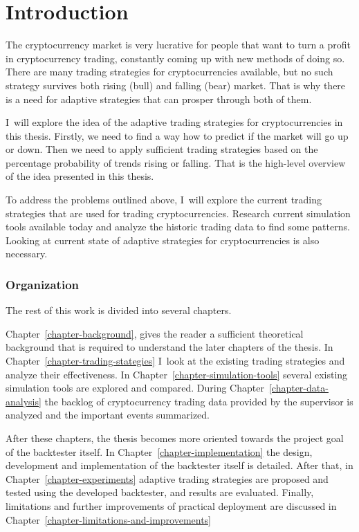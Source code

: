 
\chapter{Introduction}

The cryptocurrency market is very lucrative for people that want to turn a profit in cryptocurrency trading, constantly coming up with new methods of doing so. There are many trading strategies for cryptocurrencies available, but no such strategy survives both rising (bull) and falling (bear) market. That is why there is a need for adaptive strategies that can prosper through both of them.

I~will explore the idea of the adaptive trading strategies for cryptocurrencies in this thesis. Firstly, we need to find a way how to predict if the market will go up or down. Then we need to apply sufficient trading strategies based on the percentage probability of trends rising or falling. That is the high-level overview of the idea presented in this thesis.

To address the problems outlined above, I~will explore the current trading strategies that are used for trading cryptocurrencies. Research current simulation tools available today and analyze the historic trading data to find some patterns. Looking at current state of adaptive strategies for cryptocurrencies is also necessary.

\subsection*{Organization}

The rest of this work is divided into several chapters.

Chapter~\ref{chapter-background}, gives the reader a sufficient theoretical background that is required to understand the later chapters of the thesis. In Chapter~\ref{chapter-trading-stategies} I~look at the existing trading strategies and analyze their effectiveness. In Chapter~\ref{chapter-simulation-tools} several existing simulation tools are explored and compared. During Chapter~\ref{chapter-data-analysis} the backlog of cryptocurrency trading data provided by the supervisor is analyzed and the important events summarized.

After these chapters, the thesis becomes more oriented towards the project goal of the backtester itself. In Chapter~\ref{chapter-implementation} the design, development and implementation of the backtester itself is detailed. After that, in Chapter~\ref{chapter-experiments} adaptive trading strategies are proposed and tested using the developed backtester, and results are evaluated. Finally, limitations and further improvements of practical deployment are discussed in Chapter~\ref{chapter-limitations-and-improvements}

